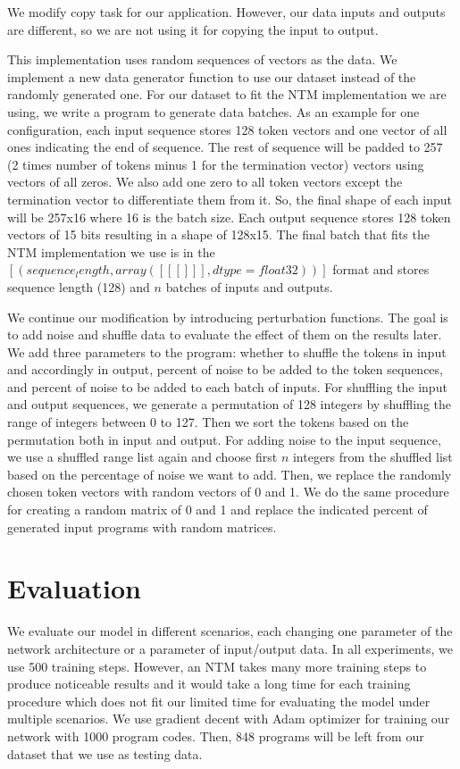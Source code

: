 \documentclass[acmsmall]{acmart}
\begin{document}
We modify copy task for our application. However, our data inputs and outputs are different, so we are not using it for copying the input to output.

This implementation uses random sequences of vectors as the data. We implement a new data generator function to use our dataset instead of the randomly generated one. For our dataset to fit the NTM implementation we are using, we write a program to generate data batches. As an example for one configuration, each input sequence stores 128 token vectors and one vector of all ones indicating the end of sequence. The rest of sequence will be padded to 257 (2 times number of tokens minus 1 for the termination vector) vectors using vectors of all zeros. We also add one zero to all token vectors except the termination vector to differentiate them from it. So, the final shape of each input will be 257x16 where 16 is the batch size. Each output sequence stores 128 token vectors of 15 bits resulting in a shape of 128x15. The final batch that fits the NTM implementation we use is in the $[(sequence_length, array([[[]]], dtype=float32))]$ format and stores sequence length (128) and $n$ batches of inputs and outputs.

We continue our modification by introducing perturbation functions. The goal is to add noise and shuffle data to evaluate the effect of them on the results later. We add three parameters to the program: whether to shuffle the tokens in input and accordingly in output, percent of noise to be added to the token sequences, and percent of noise to be added to each batch of inputs. For shuffling the input and output sequences, we generate a permutation of 128 integers by shuffling the range of integers between 0 to 127. Then we sort the tokens based on the permutation both in input and output. For adding noise to the input sequence, we use a shuffled range list again and choose first $n$ integers from the shuffled list based on the percentage of noise we want to add. Then, we replace the randomly chosen token vectors with random vectors of 0 and 1. We do the same procedure for creating a random matrix of 0 and 1 and replace the indicated percent of generated input programs with random matrices.

\section{Evaluation}
We evaluate our model in different scenarios, each changing one parameter of the network architecture or a parameter of input/output data. In all experiments, we use 500 training steps. However, an NTM takes many more training steps to produce noticeable results and it would take a long time for each training procedure which does not fit our limited time for evaluating the model under multiple scenarios. We use gradient decent with Adam optimizer for training our network with 1000 program codes. Then, 848 programs will be left from our dataset that we use as testing data.
\end{document}
